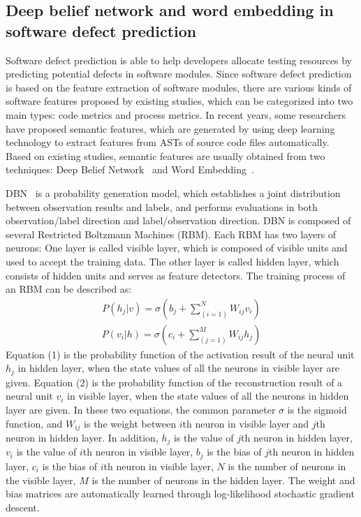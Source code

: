 \documentclass[journal]{IEEEtran}
\begin{document}
\subsection{Deep belief network and word embedding in software defect prediction}
Software defect prediction is able to help developers allocate testing resources by predicting potential defects in software modules.
Since software defect prediction is based on the feature extraction of software modules, there are various kinds of software features proposed by existing studies, which can be categorized into two main types: code metrics and process metrics. In recent years, some researchers have proposed semantic features, which are generated by using deep learning technology to extract features from ASTs of source code files automatically. Based on existing studies, semantic features are usually obtained from two techniques: Deep Belief Network~\cite{wang2018deep} and Word Embedding~\cite{fan2019deep,li2017software}.


DBN~\cite{hinton2006fast} is a probability generation model, which establishes a joint distribution between observation results and labels, and performs evaluations in both observation/label direction and label/observation direction. DBN is composed of several Restricted Boltzmann Machines (RBM). Each RBM has two layers of neurons: One layer is called visible layer, which is composed of visible units and used to accept the training data. The other layer is called hidden layer, which consists of hidden units and serves as feature detectors. The training process of an RBM can be described as:
\begin{eqnarray}
P(h_{j}|v)=\sigma(b_{j}+\sum_{(i=1)}^{N}W_{ij}v_{i})
\end{eqnarray}
\begin{eqnarray}
P(v_{i}|h)=\sigma(c_{i}+\sum_{(j=1)}^{M}W_{ij}h_{j})
\end{eqnarray}
Equation (1) is the probability function of the activation result of the neural unit $h_{j}$ in hidden layer, when the state values of all the neurons in visible layer are given. Equation (2) is the probability function of the reconstruction result of a neural unit $v_{i}$ in visible layer, when the state values of all the neurons in hidden layer are given. In these two equations, the common parameter $\sigma$ is the sigmoid function, and $W_{ij}$ is the weight between $i$th neuron in visible layer and $j$th neuron in hidden layer. In addition, $h_{j}$ is the value of $j$th neuron in hidden layer, $v_{i}$ is the value of $i$th neuron in visible layer, $b_{j}$ is the bias of $j$th neuron in hidden layer, $c_{i}$ is the bias of $i$th neuron in visible layer, $N$ is the number of neurons in the visible layer, $M$ is the number of neurons in the hidden layer. The weight and bias matrices are automatically learned through log-likelihood stochastic gradient descent.
\end{document}
